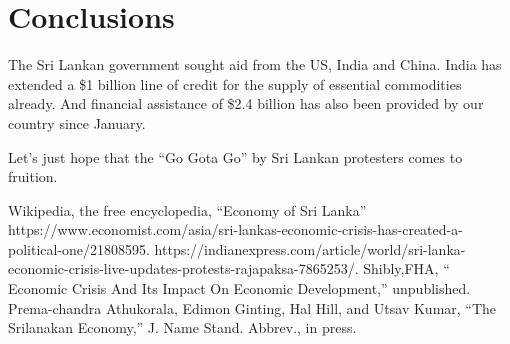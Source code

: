 \documentclass[a4paper,12pt]{article}
\begin{document}



\section{Conclusions}
The Sri Lankan government sought aid from the US, India and China. India has extended a \$1 billion line of credit for the supply of essential commodities already. And financial assistance of \$2.4 billion has also been provided by our country since January. 

Let’s just hope that the “Go Gota Go” by Sri Lankan protesters comes to fruition. 
\newpage
\begin{thebibliography}{00}
 Wikipedia, the free encyclopedia, ``Economy of Sri Lanka'' 
 https://www.economist.com/asia/sri-lankas-economic-crisis-has-created-a-political-one/21808595.
 https://indianexpress.com/article/world/sri-lanka-economic-crisis-live-updates-protests-rajapaksa-7865253/.
 Shibly,FHA, `` Economic Crisis And Its Impact On Economic Development,'' unpublished.
Prema-chandra Athukorala, Edimon Ginting,
Hal Hill, and Utsav Kumar, ``The Srilanakan Economy,'' J. Name Stand. Abbrev., in press.

\end{thebibliography}
\end{document}
